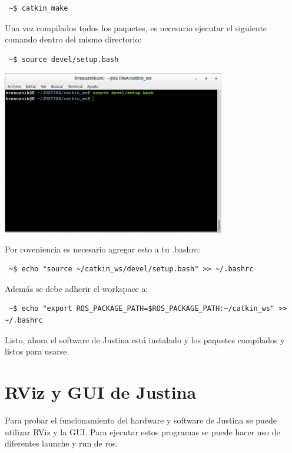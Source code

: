 \documentclass[user_manual.tex]{subfiles}
\begin{document}
\begin{verbatim}
 ~$ catkin_make
\end{verbatim}

Una vez compilados todos los paquetes, es necesario ejecutar el siguiente comando dentro del mismo directorio:

\begin{verbatim}
 ~$ source devel/setup.bash
\end{verbatim}

 \begin{center}
\includegraphics[width=0.73\textwidth]{Figures/PP/pp5.png}
\end{center}

Por coveniencia es necesario agregar esto a tu .bashrc:\\

\begin{verbatim}
 ~$ echo "source ~/catkin_ws/devel/setup.bash" >> ~/.bashrc
\end{verbatim}

Además se debe adherir el workspace a:\\

\begin{verbatim}
 ~$ echo "export ROS_PACKAGE_PATH=$ROS_PACKAGE_PATH:~/catkin_ws" >> ~/.bashrc
\end{verbatim}

Listo, ahora el software de Justina está instalado y los paquetes compilados y listos para usarse.

\section{RViz y GUI de Justina}
Para probar el funcionamiento del hardware y software de Justina se puede utilizar RViz y la GUI. Para ejecutar estos programas se puede hacer uso de diferentes launche y run de ros.
\end{document}
